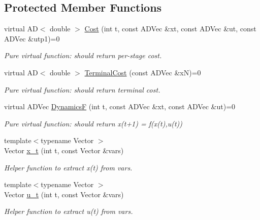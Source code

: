 \subsection*{Protected Member Functions}
\begin{DoxyCompactItemize}
\item 
\mbox{\label{classModel_aeae66d77dcacb0121cf68f268f1d05c7}} 
virtual AD$<$ double $>$ \mbox{\hyperlink{classModel_aeae66d77dcacb0121cf68f268f1d05c7}{Cost}} (int t, const A\+D\+Vec \&xt, const A\+D\+Vec \&ut, const A\+D\+Vec \&utp1)=0
\begin{DoxyCompactList}\small\item\em Pure virtual function\+: should return per-\/stage cost. \end{DoxyCompactList}\item 
\mbox{\label{classModel_a7572e6d1528397d7caa2c55291fc7527}} 
virtual AD$<$ double $>$ \mbox{\hyperlink{classModel_a7572e6d1528397d7caa2c55291fc7527}{Terminal\+Cost}} (const A\+D\+Vec \&xN)=0
\begin{DoxyCompactList}\small\item\em Pure virtual function\+: should return terminal cost. \end{DoxyCompactList}\item 
\mbox{\label{classModel_a784c4ed8ec188f4a50094057472e2fc3}} 
virtual A\+D\+Vec \mbox{\hyperlink{classModel_a784c4ed8ec188f4a50094057472e2fc3}{DynamicsF}} (int t, const A\+D\+Vec \&xt, const A\+D\+Vec \&ut)=0
\begin{DoxyCompactList}\small\item\em Pure virtual function\+: should return x(t+1) = f(x(t),u(t)) \end{DoxyCompactList}\item 
\mbox{\label{classModel_a1778b5ed2a8d6fc6ab9e6e90a6ece590}} 
{\footnotesize template$<$typename Vector $>$ }\\Vector \mbox{\hyperlink{classModel_a1778b5ed2a8d6fc6ab9e6e90a6ece590}{x\+\_\+t}} (int t, const Vector \&vars)
\begin{DoxyCompactList}\small\item\em Helper function to extract x(t) from vars. \end{DoxyCompactList}\item 
\mbox{\label{classModel_a2e0937c8d3f5b62cf90ced25903c38d1}} 
{\footnotesize template$<$typename Vector $>$ }\\Vector \mbox{\hyperlink{classModel_a2e0937c8d3f5b62cf90ced25903c38d1}{u\+\_\+t}} (int t, const Vector \&vars)
\begin{DoxyCompactList}\small\item\em Helper function to extract u(t) from vars. \end{DoxyCompactList}\end{DoxyCompactItemize}

